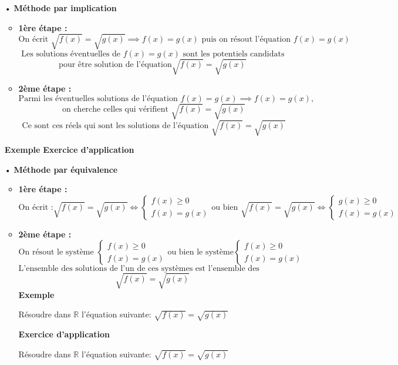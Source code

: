 \documentclass[12pt]{article}
\begin{document}
\begin{itemize}
\item[•]\textbf{Méthode par implication}

\begin{itemize}
 \item \textbf{1ère étape :}
 \[ 
 \text{On écrit } \sqrt{f(x)} = \sqrt{g(x)} \implies f(x) = g(x) \text{ puis on résout l’équation }f(x) = g(x)
 \] 
 \[ \text{ Les solutions éventuelles de } f(x) = g(x) \text{ sont les potentiels candidats } \]
 \[ \text{pour être solution de l’équation} \sqrt{f(x)} = \sqrt{g(x)}\]
 \item \textbf{2ème étape :}
 \[ 
 \text{Parmi les éventuelles solutions de l’équation } f(x) = g(x) \implies f(x) = g(x),\] 
 \[ \text{ on cherche celles qui vérifient }\sqrt{f(x)} = \sqrt{g(x)} \] 
 \[ \text{ Ce sont ces réels qui sont les solutions de l’équation } \sqrt{f(x)} = \sqrt{g(x)} \]

\end{itemize}
\textbf{Exemple} 
\textbf{Exercice d’application}
\item[•]\textbf{Méthode par équivalence}

\begin{itemize}
 \item \textbf{1ère étape :}
	\[ \text{On écrit :} \sqrt{ f(x)} = \sqrt{ g(x)} \Leftrightarrow \begin{cases} f(x) \geq 0 \\ f(x) = g(x) \end{cases} \text{ou bien } \sqrt{ f(x)} = \sqrt{ g(x)} \Leftrightarrow \begin{cases} g(x) \geq 0 \\ f(x) = g(x) \end{cases}\]
 \item \textbf{2ème étape :}
  \[ \text{On résout le système }\begin{cases}f(x) \geq 0 \\ f(x) = g(x) \end{cases} \text{ou bien le système} \begin{cases}f(x) \geq 0 \\ f(x) = g(x) \end{cases} \] 
 \[ \text{L’ensemble des solutions de l’un de ces systèmes est l’ensemble des solutions de l’équation } \]
 \[ \sqrt{ f(x)} = \sqrt{ g(x)} \]
 \textbf{Exemple} 
 
	Résoudre dans \( \mathbb{R} \) l’équation suivante: \( \sqrt{f(x)} = \sqrt{g(x)} \)
	
	\textbf{Exercice d’application}
	
Résoudre dans \( \mathbb{R} \) l’équation suivante: \( \sqrt{f(x)} = \sqrt{g(x)} \)
\end{itemize}

\end{itemize}
\end{document}

